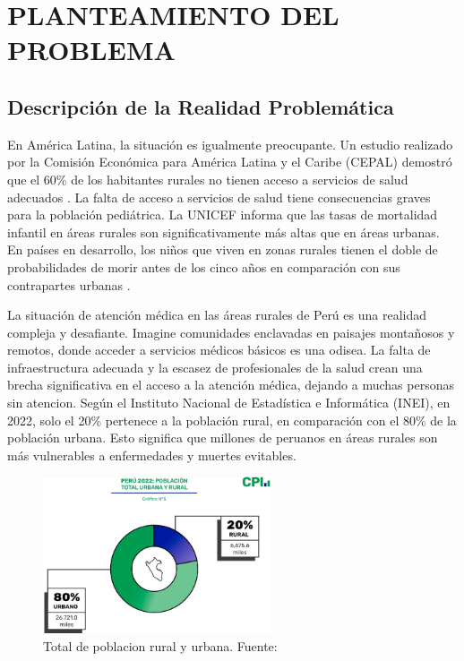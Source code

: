 \chapter{PLANTEAMIENTO DEL PROBLEMA}
\section{Descripción de la Realidad Problemática}

En América Latina, la situación es igualmente preocupante. Un estudio realizado por la Comisión Económica para América Latina y el Caribe (CEPAL) demostró que el 60\% de los habitantes rurales no tienen acceso a servicios de salud adecuados \citep*{OECD_World_Bank_2020}. La falta de acceso a servicios de salud tiene consecuencias graves para la población pediátrica. La UNICEF informa que las tasas de mortalidad infantil en áreas rurales son significativamente más altas que en áreas urbanas. En países en desarrollo, los niños que viven en zonas rurales tienen el doble de probabilidades de morir antes de los cinco años en comparación con sus contrapartes urbanas \cite{Unicef}.

La situación de atención médica en las áreas rurales de Perú es una realidad compleja y desafiante. Imagine comunidades enclavadas en paisajes montañosos y remotos, donde acceder a servicios médicos básicos es una odisea. La falta de infraestructura adecuada y la escasez de profesionales de la salud crean una brecha significativa en el acceso a la atención médica, dejando a muchas personas sin atencion. Según el Instituto Nacional de Estadística e Informática (INEI), en 2022, solo el 20\% pertenece a la población rural, en comparación con el 80\% de la población urbana. Esto significa que millones de peruanos en áreas rurales son más vulnerables a enfermedades y muertes evitables.

\begin{figure}[H]
	\begin{center}
		\includegraphics[width=0.6\textwidth]{1/figures/INEITOTAL.jpeg}
		\caption{Total de poblacion rural y urbana. Fuente: \cite{gl_inei}}
		\label{1:fig}
	\end{center}
\end{figure}

